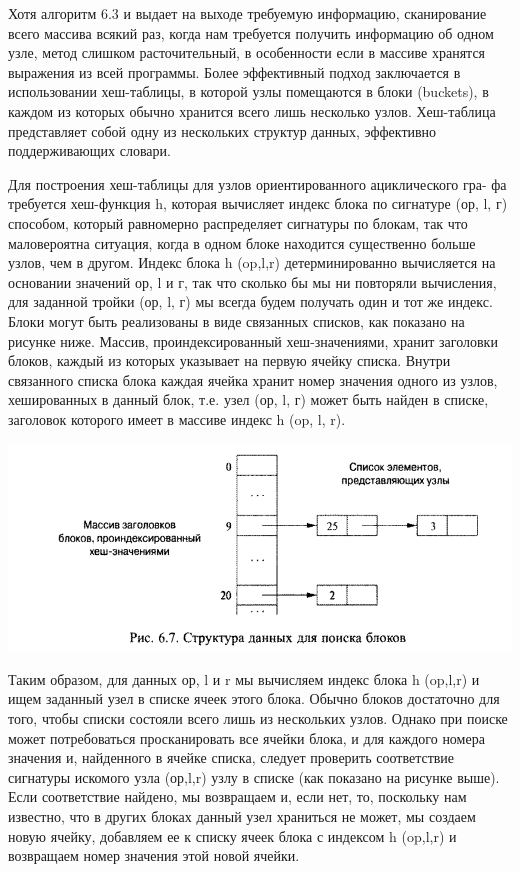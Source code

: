 Хотя алгоритм 6.3 и выдает на выходе требуемую информацию, сканирование всего массива всякий раз, когда нам требуется получить информацию об одном узле, метод слишком расточительный, в особенности если в массиве хранятся выражения из всей программы. Более эффективный подход заключается в использовании хеш-таблицы, в которой узлы помещаются в блоки (buckets), в каждом из которых обычно хранится всего лишь несколько узлов. Хеш-таблица представляет собой одну из нескольких структур данных, эффективно поддерживающих словари.

Для построения хеш-таблицы для узлов ориентированного ациклического гра- фа требуется хеш-функция h, которая вычисляет индекс блока по сигнатуре (ор, l, г) способом, который равномерно распределяет сигнатуры по блокам, так что маловероятна ситуация, когда в одном блоке находится существенно больше узлов, чем в другом. Индекс блока h (op,l,r) детерминированно вычисляется на основании значений ор, l и г, так что сколько бы мы ни повторяли вычисления, для заданной тройки (ор, l, г) мы всегда будем получать один и тот же индекс.
Блоки могут быть реализованы в виде связанных списков, как показано на рисунке ниже. Массив, проиндексированный хеш-значениями, хранит заголовки блоков, каждый из которых указывает на первую ячейку списка. Внутри связанного списка блока каждая ячейка хранит номер значения одного из узлов, хешированных в данный блок, т.е. узел (ор, l, г) может быть найден в списке, заголовок которого имеет в массиве индекс h (op, l, r).

\includegraphics[width=\linewidth]{pics/hash_table_arg.png}

Таким образом, для данных ор, l и r мы вычисляем индекс блока h (op,l,r) и ищем заданный узел в списке ячеек этого блока. Обычно блоков достаточно для того, чтобы списки состояли всего лишь из нескольких узлов. Однако при поиске может потребоваться просканировать все ячейки блока, и для каждого номера значения и, найденного в ячейке списка, следует проверить соответствие сигнатуры искомого узла (ор,l,r) узлу в списке (как показано на рисунке выше). Если соответствие найдено, мы возвращаем и, если нет, то, поскольку нам известно, что в других блоках данный узел храниться не может, мы создаем новую ячейку, добавляем ее к списку ячеек блока с индексом h (op,l,r) и возвращаем номер значения этой новой ячейки.